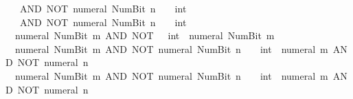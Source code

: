 \begin{isabellebody}
\ \ {\isacartoucheopen}{}\ AND\ NOT\ {\isacharparenleft}{\kern0pt}numeral\ {\isacharparenleft}{\kern0pt}Num{\isachardot}{\kern0pt}Bit{}\ n{\isacharparenright}{\kern0pt}{\isacharparenright}{\kern0pt}\ {\isacharequal}{\kern0pt}\ {\isacharparenleft}{\kern0pt}{}\ {\isacharcolon}{\kern0pt}{\isacharcolon}{\kern0pt}\ int{\isacharparenright}{\kern0pt}{\isacartoucheclose}\isanewline
\ \ {\isacartoucheopen}{}\ AND\ NOT\ {\isacharparenleft}{\kern0pt}numeral\ {\isacharparenleft}{\kern0pt}Num{\isachardot}{\kern0pt}Bit{}\ n{\isacharparenright}{\kern0pt}{\isacharparenright}{\kern0pt}\ {\isacharequal}{\kern0pt}\ {\isacharparenleft}{\kern0pt}{}\ {\isacharcolon}{\kern0pt}{\isacharcolon}{\kern0pt}\ int{\isacharparenright}{\kern0pt}{\isacartoucheclose}\isanewline
\ \ {\isacartoucheopen}numeral\ {\isacharparenleft}{\kern0pt}Num{\isachardot}{\kern0pt}Bit{}\ m{\isacharparenright}{\kern0pt}\ AND\ NOT\ {\isacharparenleft}{\kern0pt}{}\ {\isacharcolon}{\kern0pt}{\isacharcolon}{\kern0pt}\ int{\isacharparenright}{\kern0pt}\ {\isacharequal}{\kern0pt}\ numeral\ {\isacharparenleft}{\kern0pt}Num{\isachardot}{\kern0pt}Bit{}\ m{\isacharparenright}{\kern0pt}{\isacartoucheclose}\isanewline
\ \ {\isacartoucheopen}numeral\ {\isacharparenleft}{\kern0pt}Num{\isachardot}{\kern0pt}Bit{}\ m{\isacharparenright}{\kern0pt}\ AND\ NOT\ {\isacharparenleft}{\kern0pt}numeral\ {\isacharparenleft}{\kern0pt}Num{\isachardot}{\kern0pt}Bit{}\ n{\isacharparenright}{\kern0pt}{\isacharparenright}{\kern0pt}\ {\isacharequal}{\kern0pt}\ {\isacharparenleft}{\kern0pt}{}\ {\isacharcolon}{\kern0pt}{\isacharcolon}{\kern0pt}\ int{\isacharparenright}{\kern0pt}\ {\isacharasterisk}{\kern0pt}\ {\isacharparenleft}{\kern0pt}numeral\ m\ AND\ NOT\ {\isacharparenleft}{\kern0pt}numeral\ n{\isacharparenright}{\kern0pt}{\isacharparenright}{\kern0pt}{\isacartoucheclose}\isanewline
\ \ {\isacartoucheopen}numeral\ {\isacharparenleft}{\kern0pt}Num{\isachardot}{\kern0pt}Bit{}\ m{\isacharparenright}{\kern0pt}\ AND\ NOT\ {\isacharparenleft}{\kern0pt}numeral\ {\isacharparenleft}{\kern0pt}Num{\isachardot}{\kern0pt}Bit{}\ n{\isacharparenright}{\kern0pt}{\isacharparenright}{\kern0pt}\ {\isacharequal}{\kern0pt}\ {\isacharparenleft}{\kern0pt}{}\ {\isacharcolon}{\kern0pt}{\isacharcolon}{\kern0pt}\ int{\isacharparenright}{\kern0pt}\ {\isacharasterisk}{\kern0pt}\ {\isacharparenleft}{\kern0pt}numeral\ m\ AND\ NOT\ {\isacharparenleft}{\kern0pt}numeral\ n{\isacharparenright}{\kern0pt}{\isacharparenright}{\kern0pt}{\isacartoucheclose}\isanewline

\end{isabellebody}
